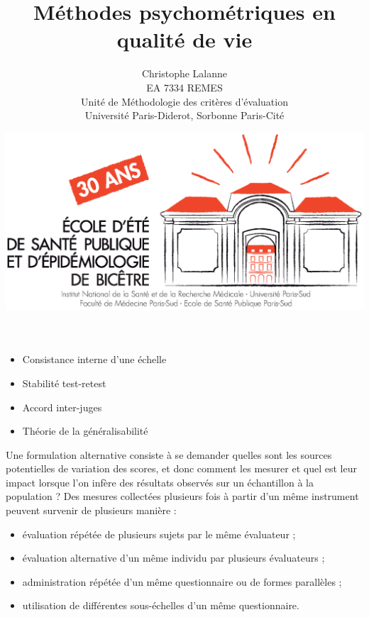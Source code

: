 

\title{Méthodes psychométriques en qualité de vie}
\author{Christophe Lalanne\\EA 7334 REMES\\ Unité de Méthodologie des critères d’évaluation\\Université Paris-Diderot, Sorbonne Paris-Cité\\}
\date{\includegraphics[height=18ex]{logo.eps}}




\LogoOff
\maketitle
\rightfooter{\quad\textsf{\thepage}}



\begin{itemize}
\item Consistance interne d'une échelle
\item Stabilité test-retest
\item Accord inter-juges
\item Théorie de la généralisabilité
\end{itemize}




Une formulation alternative consiste à se demander quelles sont les sources
potentielles de variation des scores, et donc comment les mesurer et quel est
leur impact lorsque l'on infère des résultats observés sur un échantillon à la
population ?
Des mesures collectées plusieurs fois à partir d'un même instrument peuvent
survenir de plusieurs manière\autocite{Dunn2000} :
\begin{itemize}
\item évaluation répétée de plusieurs sujets par le même évaluateur ;
\item évaluation alternative d'un même individu par plusieurs évaluateurs ;
\item administration répétée d'un même questionnaire ou de formes parallèles ;
\item utilisation de différentes sous-échelles d'un même questionnaire.
\end{itemize}

